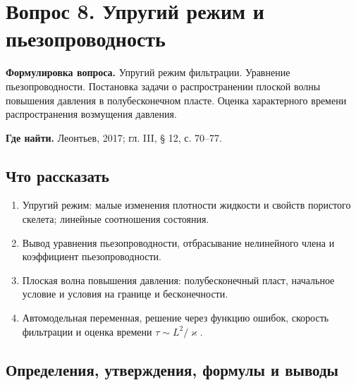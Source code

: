 \documentclass[12pt,a4paper]{article}
\newcounter{questionnumber}
\begin{document}
\clearpage
\setcounter{questionnumber}{8}
\setcounter{equation}{0}
\setcounter{footnote}{0}
\section*{Вопрос 8. Упругий режим и пьезопроводность}
\textbf{Формулировка вопроса.} Упругий режим фильтрации. Уравнение пьезопроводности. Постановка задачи о распространении плоской волны повышения давления в полубесконечном пласте. Оценка характерного времени распространения возмущения давления.

\medskip
\textbf{Где найти.} Леонтьев, 2017; гл. III, § 12, с. 70--77.

\subsection*{Что рассказать}
\begin{enumerate}
\item Упругий режим: малые изменения плотности жидкости и свойств пористого скелета; линейные соотношения состояния.
\item Вывод уравнения пьезопроводности, отбрасывание нелинейного члена и коэффициент пьезопроводности.
\item Плоская волна повышения давления: полубесконечный пласт, начальное условие и условия на границе и бесконечности.
\item Автомодельная переменная, решение через функцию ошибок, скорость фильтрации и оценка времени $\tau\sim L^2/\varkappa$.
\end{enumerate}
\subsection*{Определения, утверждения, формулы и выводы}
\begingroup
\end{document}
